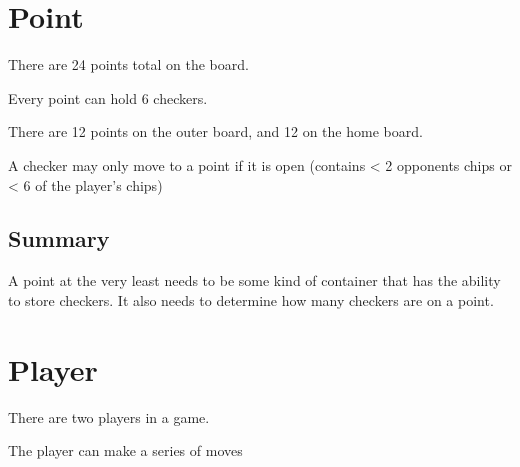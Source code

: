 \documentclass{report}
\begin{document}
\section{Point}

\begin{dashed}
    \item There are 24 points total on the board.
    \item Every point can hold 6 checkers.
    \item There are 12 points on the outer board, and 12 on the home board.
    \item A checker may only move to a point if it is open (contains < 2 opponents chips
        or < 6 of the player's chips)
\end{dashed}

\subsection{Summary}

A point at the very least needs to be some kind of container that has the ability
to store checkers. It also needs to determine how many checkers are on a point.

\section{Player}

\begin{dashed}
    \item There are two players in a game.
    \item The player can make a series of moves
\end{dashed}
\end{document}
